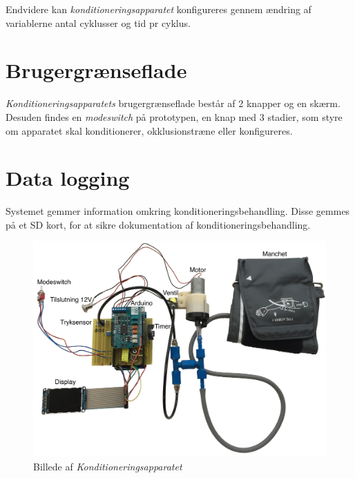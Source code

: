 Endvidere kan \textit{konditioneringsapparatet} konfigureres gennem ændring af variablerne antal cyklusser og tid pr cyklus.


\section{Brugergrænseflade}
\textit{Konditioneringsapparatets} brugergrænseflade består af 2 knapper og en skærm. Desuden findes en \textit{modeswitch} på prototypen, en knap med 3 stadier, som styre om apparatet skal konditionerer, okklusionstræne eller konfigureres.  

\section{Data logging}
Systemet gemmer information omkring konditioneringsbehandling. Disse gemmes på et SD kort, for at sikre dokumentation af konditioneringsbehandling.

\begin{figure}[H]
	\centering
	\includegraphics[width = \textwidth]{billeder/Konditioneringsapparat-tekst.png}
	\caption{Billede af \textit{Konditioneringsapparatet}} \label{fig:oversigtsbillede}
\end{figure}